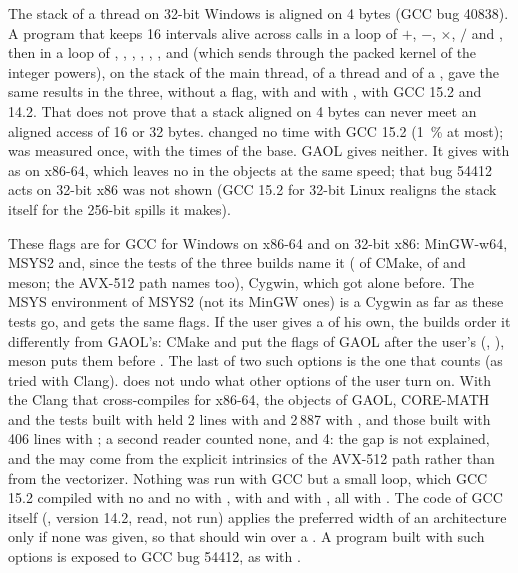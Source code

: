 \documentclass[12pt,a4paper,twoside,openright]{book}
\begin{document}
\medskip
The stack of a thread on 32-bit Windows is aligned on 4 bytes (GCC bug
40838). A program that keeps 16 intervals alive across calls in a loop of
$+$, $-$, $\times$, $/$ and , then in a loop of ,
, , , ,
,  and  (which  sends through the
packed kernel of the integer powers), on the stack of the main thread, of a
 thread and of a , gave the same results
in the three, without a flag, with  and with
, with GCC 15.2 and 14.2. That does
not prove that a stack aligned on 4 bytes can never meet an aligned access of
16 or 32 bytes.  changed no time with GCC 15.2 (1~\%
at most);  was measured once, with the
times of the base. GAOL gives neither. It gives
 with  as on x86-64, which
leaves no  in the objects at the same speed; that bug 54412 acts
on 32-bit x86 was not shown (GCC 15.2 for 32-bit Linux realigns the stack
itself for the 256-bit spills it makes).

\medskip
These flags are for GCC for Windows on x86-64 and on 32-bit x86: MinGW-w64,
MSYS2 and, since the tests of the three builds name it ( of
CMake,  of  and meson; the AVX-512 path
names  too), Cygwin, which got  alone
before.\newinvfive{} The MSYS environment of MSYS2 (not its MinGW ones) is a
Cygwin as far as these tests go, and gets the same flags. If the user gives a
 of his own, the builds order it differently
from GAOL's: CMake and  put the flags of GAOL after the user's
(, ), meson puts them before
. The last of two such options is the one that counts (as
tried with Clang).  does not undo what
other options of the user turn on. With the Clang that cross-compiles for
x86-64, the objects of GAOL, CORE-MATH and the tests built with
 held 2 lines with
 and 2\,887 with , and those built with
 406 lines with
; a second reader counted none, and 4: the gap is not explained,
and the  may come from the explicit intrinsics of the AVX-512 path
rather than from the vectorizer. Nothing was run with GCC but a small loop,
which GCC 15.2 compiled with no  and no  with
, with  and with
, all with . The code
of GCC itself (, version 14.2, read,
not run) applies the preferred width of an architecture only if none was
given, so that  should win over a
. A program built with such options is exposed to GCC bug
54412, as with .
\end{document}
